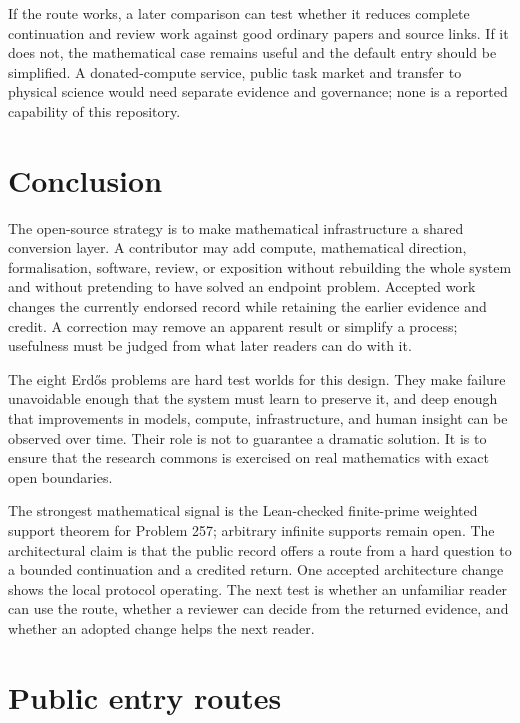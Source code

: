 \documentclass[10pt]{article}
\begin{document}
If the route works, a later comparison can test whether it reduces complete
continuation and review work against good ordinary papers and source links.
If it does not, the mathematical case remains useful and the default entry
should be simplified. A donated-compute service, public task market and
transfer to physical science would need separate evidence and governance;
none is a reported capability of this repository.

\section{Conclusion}\label{sec:conclusion}

The open-source strategy is to make mathematical infrastructure a shared
conversion layer.  A contributor may add compute, mathematical direction,
formalisation, software, review, or exposition without rebuilding the whole
system and without pretending to have solved an endpoint problem. Accepted
work changes the currently endorsed record while retaining the earlier
evidence and credit. A correction may remove an apparent result or simplify
a process; usefulness must be judged from what later readers can do with it.

The eight Erd\H{o}s problems are hard test worlds for this design.  They make
failure unavoidable enough that the system must learn to preserve it, and
deep enough that improvements in models, compute, infrastructure, and human
insight can be observed over time.  Their role is not to guarantee a dramatic
solution.  It is to ensure that the research commons is exercised on real
mathematics with exact open boundaries.

The strongest mathematical signal is the Lean-checked finite-prime weighted
support theorem for Problem 257; arbitrary infinite supports remain open.
The architectural claim is that the public record offers a route from a hard
question to a bounded continuation and a credited return. One accepted
architecture change shows the local protocol operating. The next test is
whether an unfamiliar reader can use the route, whether a reviewer can decide
from the returned evidence, and whether an adopted change helps the next
reader.

\appendix
\section{Public entry routes}\label{app:routes}
\end{document}

